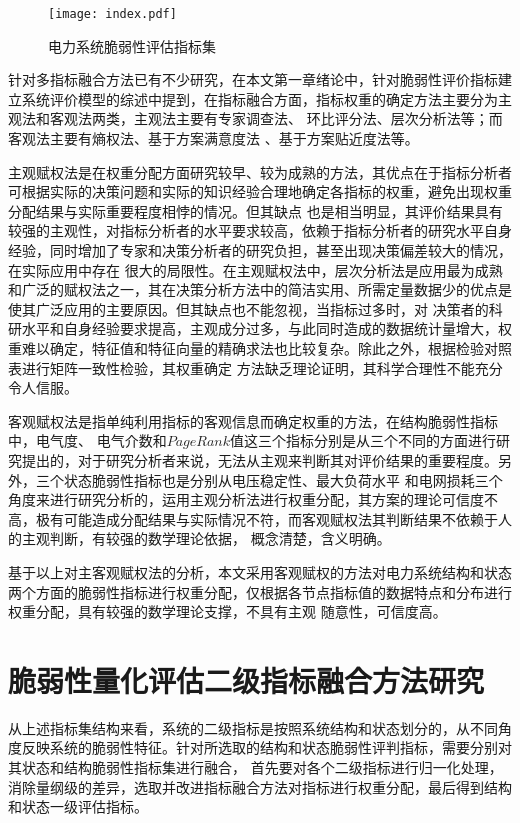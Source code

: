 \begin{figure}[H] %
    \centering
    \texttt{[image: index.pdf]}
    \caption{电力系统脆弱性评估指标集}
    \label{fig:index}
  \end{figure}

针对多指标融合方法已有不少研究，在本文第一章绪论中，针对脆弱性评价指标建立系统评价模型的综述中提到，在指标融合方面，指标权重的确定方法主要分为主观法和客观法两类，主观法主要有专家调查法、
环比评分法、层次分析法等；而客观法主要有熵权法、基于方案满意度法 、基于方案贴近度法等。

主观赋权法是在权重分配方面研究较早、较为成熟的方法，其优点在于指标分析者可根据实际的决策问题和实际的知识经验合理地确定各指标的权重，避免出现权重分配结果与实际重要程度相悖的情况。但其缺点
也是相当明显，其评价结果具有较强的主观性，对指标分析者的水平要求较高，依赖于指标分析者的研究水平自身经验，同时增加了专家和决策分析者的研究负担，甚至出现决策偏差较大的情况，在实际应用中存在
很大的局限性。在主观赋权法中，层次分析法是应用最为成熟和广泛的赋权法之一，其在决策分析方法中的简洁实用、所需定量数据少的优点是使其广泛应用的主要原因。但其缺点也不能忽视，当指标过多时，对
决策者的科研水平和自身经验要求提高，主观成分过多，与此同时造成的数据统计量增大，权重难以确定，特征值和特征向量的精确求法也比较复杂。除此之外，根据检验对照表进行矩阵一致性检验，其权重确定
方法缺乏理论证明，其科学合理性不能充分令人信服。


客观赋权法是指单纯利用指标的客观信息而确定权重的方法，在结构脆弱性指标中，电气度、
电气介数和$PageRank$值这三个指标分别是从三个不同的方面进行研究提出的，对于研究分析者来说，无法从主观来判断其对评价结果的重要程度。另外，三个状态脆弱性指标也是分别从电压稳定性、最大负荷水平
和电网损耗三个角度来进行研究分析的，运用主观分析法进行权重分配，其方案的理论可信度不高，极有可能造成分配结果与实际情况不符，而客观赋权法其判断结果不依赖于人的主观判断，有较强的数学理论依据，
概念清楚，含义明确。

基于以上对主客观赋权法的分析，本文采用客观赋权的方法对电力系统结构和状态两个方面的脆弱性指标进行权重分配，仅根据各节点指标值的数据特点和分布进行权重分配，具有较强的数学理论支撑，不具有主观
随意性，可信度高。


\section{脆弱性量化评估二级指标融合方法研究}
\label{sec:processIndex}
从上述指标集结构来看，系统的二级指标是按照系统结构和状态划分的，从不同角度反映系统的脆弱性特征。针对所选取的结构和状态脆弱性评判指标，需要分别对其状态和结构脆弱性指标集进行融合，
首先要对各个二级指标进行归一化处理，消除量纲级的差异，选取并改进指标融合方法对指标进行权重分配，最后得到结构和状态一级评估指标。



